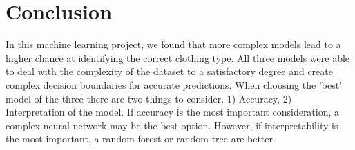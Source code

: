 \section{Conclusion}
In this machine learning project, we found that more complex models lead to a higher chance at identifying the correct clothing type.
All three models were able to deal with the complexity of the dataset to a satisfactory degree and create complex decision boundaries for accurate predictions.
When choosing the 'best' model of the three there are two things to consider.
1) Accuracy, 2) Interpretation of the model.
If accuracy is the most important consideration, a complex neural network may be the best option.
However, if interpretability is the most important, a random forest or random tree are better.
